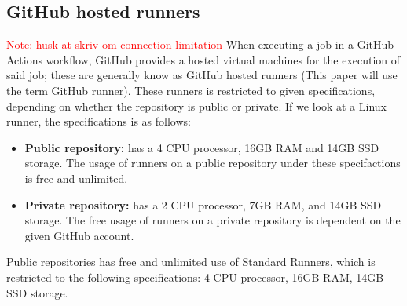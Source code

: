 \subsection{GitHub hosted runners}
\label{sec:githubRunner}
\textcolor{red}{Note: husk at skriv om connection limitation}
When executing a job in a GitHub Actions workflow, GitHub provides a hosted virtual machines for the execution of said job; these are generally know as GitHub hosted runners (This paper will use the term GitHub runner). These runners is restricted to given specifications, depending on whether the repository is public or private. If we look at a Linux runner, the specifications is as follows:
\begin{itemize}
    \item \textbf{Public repository:} has a 4 CPU processor, 16GB RAM and 14GB SSD storage. The usage of runners on a public repository under these specifactions is free and unlimited.
    \item \textbf{Private repository:} has a 2 CPU processor, 7GB RAM, and 14GB SSD storage. The free usage of runners on a private repository is dependent on the given GitHub account.
\end{itemize}

Public repositories has free and unlimited use of Standard Runners, which is restricted to the following specifications: 4 CPU processor, 16GB RAM, 14GB SSD storage.